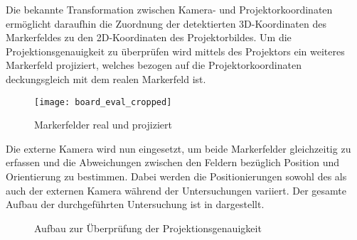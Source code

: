Die bekannte Transformation zwischen Kamera- und Projektorkoordinaten ermöglicht daraufhin die Zuordnung der detektierten 3D-Koordinaten des Markerfeldes zu den 2D-Koordinaten des Projektorbildes. Um die Projektionsgenauigkeit zu überprüfen wird mittels des Projektors ein weiteres Markerfeld projiziert, welches bezogen auf die Projektorkoordinaten deckungsgleich mit dem realen Markerfeld ist. \\

\begin{figure}[!ht]
	\begin{center}
		\texttt{[image: board\_eval\_cropped]}
		\caption{Markerfelder real und projiziert}
		\label{fig.arprojected}
	\end{center}
\end{figure}

Die externe Kamera wird nun eingesetzt, um beide Markerfelder gleichzeitig zu erfassen und die Abweichungen zwischen den Feldern bezüglich Position und Orientierung zu bestimmen. Dabei werden die Positionierungen sowohl des  als auch der externen Kamera während der Untersuchungen variiert. Der gesamte Aufbau der durchgeführten Untersuchung ist in  dargestellt.

\begin{figure}[ht]
	\begin{center}%
		\caption{Aufbau zur Überprüfung der Projektionsgenauigkeit}
		\label{fig.projsetup}
	\end{center}
\end{figure}

\red[Die Ergebnisse der $n=6$ Messreihen mit insgesamt $X$ Messungen sind als Box-Whisker-Plot in \abb{fig.boxplot_proj} dargestellt.]






%
